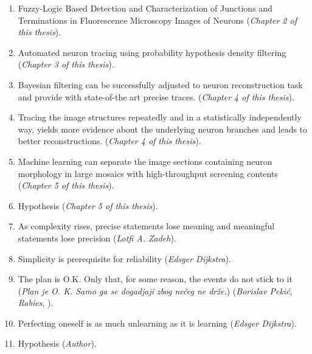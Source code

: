\documentclass[10pt, twoside]{report}
\begin{document}
\begin{enumerate}
  
\item Fuzzy-Logic Based Detection and Characterization of Junctions and Terminations in Fluorescence Microscopy Images of Neurons (\emph{Chapter 2 of this thesis}). 
  
\medskip
  
\item Automated neuron tracing using probability hypothesis density filtering
	(\emph{Chapter 3 of this thesis}).  
  
\medskip
\item Bayesian filtering can be successfully adjusted to neuron reconstruction task and provide with state-of-the art precise traces. 
	(\emph{Chapter 4 of this thesis}).
	
\medskip
\item Tracing the image structures repeatedly and in a statistically independently way, yields more evidence about the underlying neuron branches and leads to better reconstructions.
	(\emph{Chapter 4 of this thesis}).

\medskip
\item Machine learning can separate the image sections containing neuron morphology in large mosaics with high-throughput screening contents (\emph{Chapter 5 of this thesis}). 

\medskip

\item Hypothesis (\emph{Chapter 5 of this thesis}). 

\medskip 

\item As complexity rises, precise statements lose meaning and meaningful statements lose precision (\emph{Lotfi A. Zadeh}). 

\medskip
  
\item Simplicity is prerequisite for reliability (\emph{Edsger Dijkstra}). 

\medskip

\item The plan is O.K. Only that, for some reason, the events do not stick to it (\emph{Plan je O. K. Samo ga se dogadjaji zbog ne\v{c}eg ne dr\v{z}e.}) (\emph{Borislav Peki\'{c}}, \emph{Rabies}, ).

\medskip

\item Perfecting oneself is as much unlearning as it is learning (\emph{Edsger Dijkstra}).

\medskip

\item Hypothesis (\emph{Author}).
\medskip

\end{enumerate}

\end{document}
